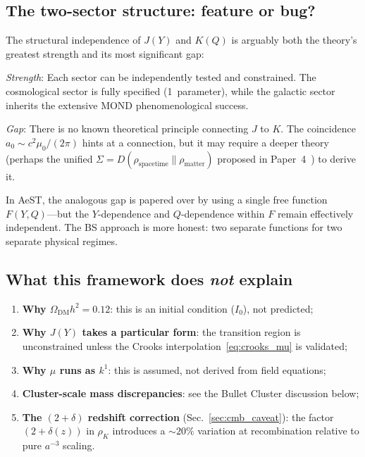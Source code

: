 \documentclass[prd,twocolumn,superscriptaddress,longbibliography,floatfix]{revtex4-2}
\begin{document}
\subsection{The two-sector structure: feature or bug?}

The structural independence of $J(Y)$ and $K(Q)$ is arguably
both the theory's greatest strength and its most significant
gap:

\emph{Strength}: Each sector can be independently tested and
constrained.  The cosmological sector is fully specified
(1~parameter), while the galactic sector inherits the extensive
MOND phenomenological success.

\emph{Gap}: There is no known theoretical principle connecting
$J$ to $K$.  The coincidence $a_0 \sim c^2\mu_0/(2\pi)$
hints at a connection, but it may require a deeper theory
(perhaps the unified $\Sigma = D(\rho_{\mathrm{spacetime}} \|
\rho_{\mathrm{matter}})$ proposed in Paper~4~\cite{Paper4})
to derive it.

In AeST, the analogous gap is papered over by using a single
free function $F(Y,Q)$---but the $Y$-dependence and
$Q$-dependence within $F$ remain effectively independent.
The BS approach is more honest: two separate functions for
two separate physical regimes.

\subsection{What this framework does \emph{not} explain}

\begin{enumerate}
\item \textbf{Why $\Omega_{\mathrm{DM}}h^2 = 0.12$}: this is
  an initial condition ($I_0$), not predicted;
\item \textbf{Why $J(Y)$ takes a particular form}: the transition
  region is unconstrained unless the Crooks
  interpolation~\eqref{eq:crooks_mu} is validated;
\item \textbf{Why $\mu$ runs as $k^1$}: this is assumed, not
  derived from field equations;
\item \textbf{Cluster-scale mass discrepancies}: see the Bullet
  Cluster discussion below;
\item \textbf{The $(2{+}\delta)$ redshift correction}
  (Sec.~\ref{sec:cmb_caveat}): the factor $(2{+}\delta(z))$ in
  $\rho_K$ introduces a $\sim\!20\%$ variation at recombination
  relative to pure $a^{-3}$ scaling.
\end{enumerate}
\end{document}
